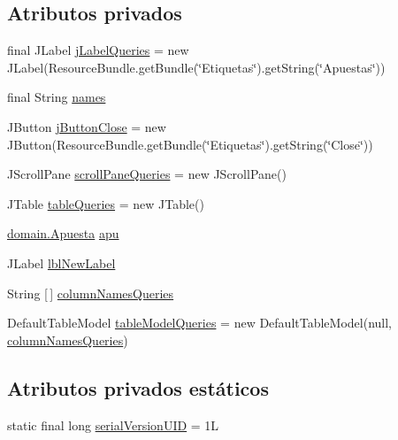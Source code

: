 \subsection*{Atributos privados}
\begin{DoxyCompactItemize}
\item 
final J\+Label \mbox{\hyperlink{classgui_1_1MisApuestasGUI_a4260727efd46f4e5d89996b20f985db9}{j\+Label\+Queries}} = new J\+Label(Resource\+Bundle.\+get\+Bundle(\char`\"{}Etiquetas\char`\"{}).get\+String(\char`\"{}Apuestas\char`\"{}))
\item 
final String \mbox{\hyperlink{classgui_1_1MisApuestasGUI_a3a53904c8f32e79970c451babb341c0f}{names}}
\item 
J\+Button \mbox{\hyperlink{classgui_1_1MisApuestasGUI_aa615613172db72df62ed1bb0f49dfe8e}{j\+Button\+Close}} = new J\+Button(Resource\+Bundle.\+get\+Bundle(\char`\"{}Etiquetas\char`\"{}).get\+String(\char`\"{}Close\char`\"{}))
\item 
J\+Scroll\+Pane \mbox{\hyperlink{classgui_1_1MisApuestasGUI_a6fd37cfa9f4c3398f088d09b39eb2a6d}{scroll\+Pane\+Queries}} = new J\+Scroll\+Pane()
\item 
J\+Table \mbox{\hyperlink{classgui_1_1MisApuestasGUI_ac491e3e6bdb260a5f8cf5a481d7f202d}{table\+Queries}} = new J\+Table()
\item 
\mbox{\hyperlink{classdomain_1_1Apuesta}{domain.\+Apuesta}} \mbox{\hyperlink{classgui_1_1MisApuestasGUI_a7d788b288a5ded17f50e9fad2cc01eb3}{apu}}
\item 
J\+Label \mbox{\hyperlink{classgui_1_1MisApuestasGUI_a4639e119f80cd3a6f348340e81edfca2}{lbl\+New\+Label}}
\item 
String \mbox{[}$\,$\mbox{]} \mbox{\hyperlink{classgui_1_1MisApuestasGUI_a7c997693da66f870e09041a88e02291e}{column\+Names\+Queries}}
\item 
Default\+Table\+Model \mbox{\hyperlink{classgui_1_1MisApuestasGUI_a9585a674d2e1b1868bc189e3c356e574}{table\+Model\+Queries}} = new Default\+Table\+Model(null, \mbox{\hyperlink{classgui_1_1MisApuestasGUI_a7c997693da66f870e09041a88e02291e}{column\+Names\+Queries}})
\end{DoxyCompactItemize}
\subsection*{Atributos privados estáticos}
\begin{DoxyCompactItemize}
\item 
static final long \mbox{\hyperlink{classgui_1_1MisApuestasGUI_ad1dd6ed7b51186ceeb9b75a53a42b4ff}{serial\+Version\+U\+ID}} = 1L
\end{DoxyCompactItemize}


